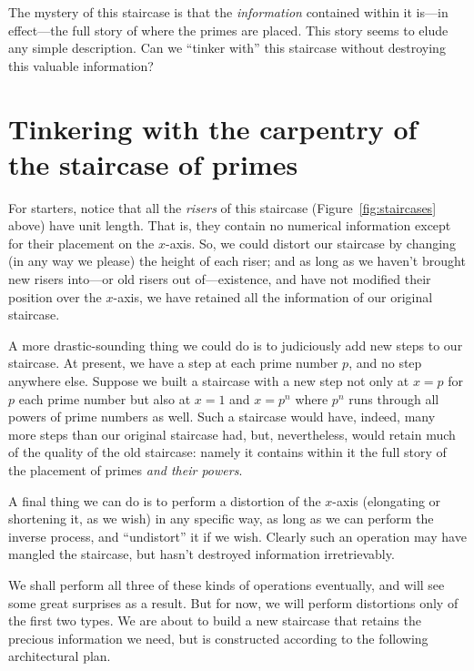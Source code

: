 \documentclass[openany]{book}
\theoremstyle{plain}
\theoremstyle{definition}
\begin{document}
The mystery of this staircase is that the {\em information} contained
within it is---in effect---the full story of where the primes are
placed. This story seems to elude any simple description.  Can we
``tinker with'' this staircase without destroying this valuable
information?
 
 
 

\chapter[Tinkering with the staircase of primes]{Tinkering with the carpentry of the staircase of primes\label{sec:tinkering}}

 
For starters, notice that all the {\em risers} of this staircase (Figure~\ref{fig:staircases} above) have
unit length. That is, they contain no numerical information except for
their placement on the $x$-axis. So, we could distort our staircase by
changing (in any way we please) the height of each riser; and as long
as we haven't brought new risers into---or old risers out
of---existence, and have not modified their position over the
$x$-axis, we have retained all the information of our original
staircase.
   
   
A more drastic-sounding thing we could do is to judiciously add new
steps to our staircase. At present, we have a step at each prime
number $p$, and no step anywhere else. Suppose we built a staircase
with a new step not only at $x=p$ for $p$ each prime number but also at 
$x =1$ and $x=p^n$ where $p^n$ runs through all powers of prime numbers as
well. Such a staircase would have, indeed, many more steps than our
original staircase had, but, nevertheless, would retain much of the
quality of the old staircase: namely it contains within it the full
story of the placement of primes {\em and their powers}.
     
A final thing we can do is to perform a distortion of the $x$-axis
(elongating or shortening it, as we wish) in any specific way, as long
as we can perform the inverse process, and ``undistort'' it if we wish.
Clearly such an operation may have mangled the staircase, but hasn't destroyed
information irretrievably.
     
We shall perform all three of these kinds of operations eventually,
and will see some great surprises as a result.  But for now, we will
perform distortions only of the first two types.  We are about to
build a new staircase that retains the precious information we need,
but is constructed according to the following architectural plan.
 
\end{document}
